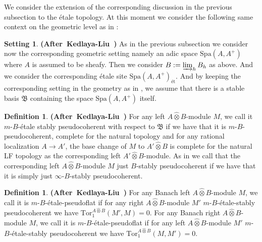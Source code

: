\documentclass[12pt]{amsart}
\theoremstyle{definition}
\newtheorem{definition}[theorem]{Definition}
\numberwithin{equation}{section}
\newtheorem{setting}[theorem]{Setting}
\begin{document}
\indent We consider the extension of the corresponding discussion in the previous subsection to the \'etale topology. At this moment we consider the following same context on the geometric level as in \cite{KL2}:


\begin{setting} \mbox{\bf{(After Kedlaya-Liu \cite[Hypothesis 2.5.8]{KL2})}} \label{setting4.15}
As in the previous subsection we consider now the corresponding geometric setting namely an adic space $\mathrm{Spa}(A,A^+)$ where $A$ is assumed to be sheafy. Then we consider $B:=\varinjlim_h B_h$ as above. And we consider the corresponding \'etale site $\mathrm{Spa}(A,A^+)_\text{\'et}$. And by keeping the corresponding setting in the geometry as in \cite[Hypothesis 2.5.8]{KL2}, we assume that there is a stable basis $\mathfrak{B}$ containing the space $\mathrm{Spa}(A,A^+)$ itself.	
\end{setting}


\begin{definition} \mbox{\bf{(After Kedlaya-Liu \cite[Definition 2.5.9]{KL2})}}
For any left $A\widehat{\otimes}B$-module $M$, we call it $m$-$B$-\'etale stably pseudocoherent with respect to $\mathfrak{B}$ if we have that it is $m$-$B$-pseudocoherent, complete for the natural topology and for any rational localization $A\rightarrow A'$, the base change of $M$ to $A'\widehat{\otimes} B$ is complete for the natural LF topology as the corresponding left $A'\widehat{\otimes} B$-module.	As in \cite[Definition 2.4.1]{KL2} we call that the corresponding left $A\widehat{\otimes}B$-module $M$ just $B$-stably pseudocoherent if we have that it is simply just $\infty$-$B$-stably pseudocoherent.
\end{definition}






\begin{definition}\mbox{\bf{(After Kedlaya-Liu \cite[Below Definition 2.5.9]{KL2})}}
For any Banach left $A\widehat{\otimes}B$-module $M$, we call it is $m$-$B$-\'etale-pseudoflat if for any right $A\widehat{\otimes}B$-module $M'$ $m$-$B$-\'etale-stably pseudocoherent we have $\mathrm{Tor}_1^{A\widehat{\otimes}B}(M',M)=0$. For any Banach right $A\widehat{\otimes}B$-module $M$, we call it is $m$-$B$-\'etale-pseudoflat if for any left $A\widehat{\otimes}B$-module $M'$ $m$-$B$-\'etale-stably pseudocoherent we have $\mathrm{Tor}_1^{A\widehat{\otimes}B}(M,M')=0$.
\end{definition}
\end{document}
